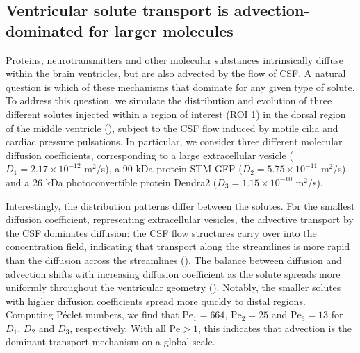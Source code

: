 \documentclass{WileyMSP-template}
\begin{document}
\subsection{Ventricular solute transport is advection-dominated for larger molecules}


Proteins, neurotransmitters and other molecular substances
intrinsically diffuse within the brain ventricles, but are also
advected by the flow of CSF. A natural question is which of these
mechanisms that dominate for any given type of solute. To address this
question, we simulate the distribution and evolution of three
different solutes injected within a region of interest (ROI 1) in the
dorsal region of the middle ventricle (),
subject to the CSF flow induced by motile cilia and cardiac pressure
pulsations. In particular, we consider three different molecular
diffusion coefficients, corresponding to a large extracellular vesicle ($D_1 = 2.17
\times 10^{-12}$ m$^2$/s), a 90 kDa protein STM-GFP ($D_2 = 5.75
\times 10^{-11}$ m$^2$/s), and a 26 kDa photoconvertible protein
Dendra2 ($D_3 = 1.15 \times 10^{-10}$ m$^2$/s).


Interestingly, the distribution patterns differ between the
solutes. For the smallest diffusion coefficient, representing
extracellular vesicles, the advective transport by the CSF dominates diffusion: the
CSF flow structures carry over into the concentration field,
indicating that transport along the streamlines is more rapid than the
diffusion across the streamlines (). The
balance between diffusion and advection shifts with increasing
diffusion coefficient as the solute spreads more uniformly throughout
the ventricular geometry (). Notably, the
smaller solutes with higher diffusion coefficients spread more quickly
to distal regions. Computing Péclet numbers, we find that
$\mathrm{Pe}_1=664$, $\mathrm{Pe}_2=25$ and $\mathrm{Pe}_3=13$ for
$D_1$, $D_2$ and $D_3$, respectively. With all $\mathrm{Pe} > 1$, this
indicates that advection is the dominant transport mechanism on a
global scale.

\end{document}
